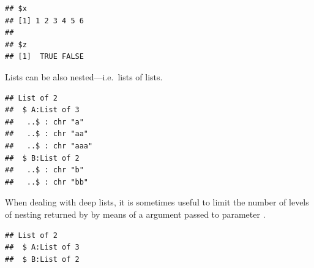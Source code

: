 \documentclass[krantz2]{krantz}\usepackage{knitr}%
\begin{document}
\begin{knitrout}\footnotesize
{}\color{fgcolor}\begin{kframe}
\begin{alltt}
\hlopt{$} \hlkwb{<-} 
\end{alltt}
\begin{verbatim}
## $x
## [1] 1 2 3 4 5 6
## 
## $z
## [1]  TRUE FALSE
\end{verbatim}
\end{kframe}
\end{knitrout}

Lists can be also nested---i.e.\ lists of lists.

\begin{knitrout}\footnotesize
{}\color{fgcolor}\begin{kframe}
\begin{alltt}
 \hlkwb{<-} \hlstd{(}\hlstd{,} \hlstd{,} \hlstd{)}
 \hlkwb{<-} \hlstd{(}\hlstd{,} \hlstd{)}
 \hlkwb{<-} \hlstd{(}   
\end{alltt}
\begin{verbatim}
## List of 2
##  $ A:List of 3
##   ..$ : chr "a"
##   ..$ : chr "aa"
##   ..$ : chr "aaa"
##  $ B:List of 2
##   ..$ : chr "b"
##   ..$ : chr "bb"
\end{verbatim}
\end{kframe}
\end{knitrout}

\begin{explainbox}
When dealing with deep lists, it is sometimes useful to limit the number of levels of nesting returned by  by means of a  argument passed to parameter .

\begin{knitrout}\footnotesize
{}\color{fgcolor}\begin{kframe}
\begin{alltt}
  \hlstd{=} \hlstd{)}
\end{alltt}
\begin{verbatim}
## List of 2
##  $ A:List of 3
##  $ B:List of 2
\end{verbatim}
\end{kframe}
\end{knitrout}

\end{explainbox}
\end{document}
